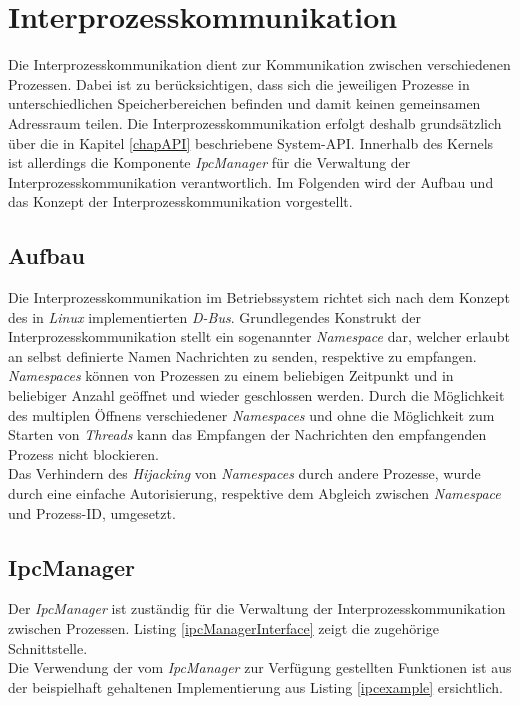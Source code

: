 \section{Interprozesskommunikation}
\label{chapIPC}
Die Interprozesskommunikation dient zur Kommunikation zwischen verschiedenen Prozessen. Dabei ist zu berücksichtigen, dass sich die jeweiligen Prozesse in unterschiedlichen Speicherbereichen befinden und damit keinen gemeinsamen Adressraum teilen. Die Interprozesskommunikation erfolgt deshalb grundsätzlich über die in Kapitel \ref{chapAPI} beschriebene System-API. Innerhalb des Kernels ist allerdings die Komponente \textit{IpcManager} für die Verwaltung der Interprozesskommunikation verantwortlich. Im Folgenden wird der Aufbau und das Konzept der Interprozesskommunikation vorgestellt.

\subsection{Aufbau}
Die Interprozesskommunikation im Betriebssystem richtet sich nach dem Konzept des in \textit{Linux} implementierten \textit{D-Bus}. Grundlegendes Konstrukt der Interprozesskommunikation stellt ein sogenannter \textit{Namespace} dar, welcher erlaubt an selbst definierte Namen Nachrichten zu senden, respektive zu empfangen. \textit{Namespaces} können von Prozessen zu einem beliebigen Zeitpunkt und in beliebiger Anzahl geöffnet und wieder geschlossen werden. Durch die Möglichkeit des multiplen Öffnens verschiedener \textit{Namespaces} und ohne die Möglichkeit zum Starten von \textit{Threads} kann das Empfangen der Nachrichten den empfangenden Prozess nicht blockieren.\\
Das Verhindern des \textit{Hijacking} von \textit{Namespaces} durch andere Prozesse, wurde durch eine einfache Autorisierung, respektive dem Abgleich zwischen \textit{Namespace} und Prozess-ID, umgesetzt.

\subsection{IpcManager}
Der \textit{IpcManager} ist zuständig für die Verwaltung der Interprozesskommunikation zwischen Prozessen. Listing \ref{ipcManagerInterface} zeigt die zugehörige Schnittstelle.\\



Die Verwendung der vom \textit{IpcManager} zur Verfügung gestellten Funktionen ist aus der beispielhaft gehaltenen Implementierung aus Listing \ref{ipcexample} ersichtlich.\\





\pagebreak 